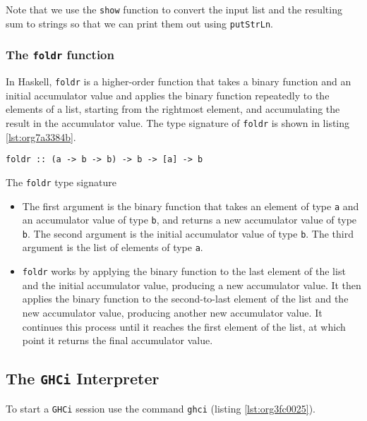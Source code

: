 \documentclass[a4paper, titlepage, twoside]{article}
\begin{document}
Note that we use the \texttt{show} function to convert the input list and the resulting sum to strings so that we can print them out using \texttt{putStrLn}.

\subsubsection{The \texttt{foldr} function}
\label{sec:orgeebaa12}

In Haskell, \texttt{foldr} is a higher-order function that takes a binary function and an initial accumulator value and applies the binary function repeatedly to the elements of a list, starting from the rightmost element, and accumulating the result in the accumulator value. The type signature of \texttt{foldr} is shown in listing \ref{lst:org7a3384b}.

\begin{listing}[htbp]
\begin{verbatim}
foldr :: (a -> b -> b) -> b -> [a] -> b
\end{verbatim}
\caption{\label{lst:org7a3384b}The \texttt{foldr} type signature}
\end{listing}

\begin{itemize}
\item The first argument is the binary function that takes an element of type \texttt{a} and an accumulator value of type \texttt{b}, and returns a new accumulator value of type \texttt{b}. The second argument is the initial accumulator value of type \texttt{b}. The third argument is the list of elements of type \texttt{a}.

\item \texttt{foldr} works by applying the binary function to the last element of the list and the initial accumulator value, producing a new accumulator value. It then applies the binary function to the second-to-last element of the list and the new accumulator value, producing another new accumulator value. It continues this process until it reaches the first element of the list, at which point it returns the final accumulator value.
\end{itemize}

\subsection{The \texttt{GHCi} Interpreter}
\label{sec:orgfa638ea}

To start a \texttt{GHCi} session use the command \texttt{ghci} (listing \ref{lst:org3fc0025}).
\end{document}
